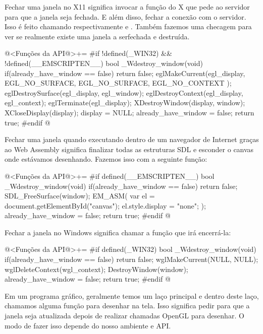 
Fechar uma janela no X11 significa invocar a função do X que pede ao
servidor para que a janela seja fechada. E além disso, fechar a
conexão com o servidor. Isso é feito chamando
respectivamente 
e . Também fazemos uma checagem para ver se
realmente existe uma janela a serfechada e destruída.

\iniciocodigo
@<Funções da API@>+=
#if !defined(_WIN32) && !defined(__EMSCRIPTEN__)
bool _Wdestroy_window(void){
  if(already_have_window == false)
    return false;
  eglMakeCurrent(egl_display, EGL_NO_SURFACE, EGL_NO_SURFACE,
                 EGL_NO_CONTEXT );
  eglDestroySurface(egl_display, egl_window);
  eglDestroyContext(egl_display, egl_context);
  eglTerminate(egl_display);
  XDestroyWindow(display, window);
  XCloseDisplay(display);
  display = NULL;
  already_have_window = false;
  return true;
}
#endif
@
\fimcodigo


Fechar uma janela quando executando dentro de um navegador de Internet
graças ao Web Assembly significa finalizar todas as estruturas SDL e
esconder o canvas onde estávamos desenhando. Fazemos isso com a
seguinte função:

\iniciocodigo
@<Funções da API@>+=
#if defined(__EMSCRIPTEN__)
bool _Wdestroy_window(void){
  if(already_have_window == false)
    return false;
  SDL_FreeSurface(window);
  EM_ASM(
    var el = document.getElementById("canvas");
    el.style.display = "none";
  );
  already_have_window = false;
  return true;
}
#endif
@
\fimcodigo


Fechar a janela no Windows significa chamar a  função que irá
encerrá-la:

\iniciocodigo
@<Funções da API@>+=
#if defined(_WIN32)
bool _Wdestroy_window(void){
  if(already_have_window == false)
    return false;
  wglMakeCurrent(NULL, NULL);
  wglDeleteContext(wgl_context);
  DestroyWindow(window);
  already_have_window = false;
  return true;
}
#endif
@
\fimcodigo


Em um programa gráfico, geralmente temos um laço principal e dentro
deste laço, chamamos alguma função para desenhar na tela. Isso
significa pedir para que a janela seja atualizada depois de realizar
chamadas OpenGL para desenhar. O modo de fazer isso depende do nosso
ambiente e API.

